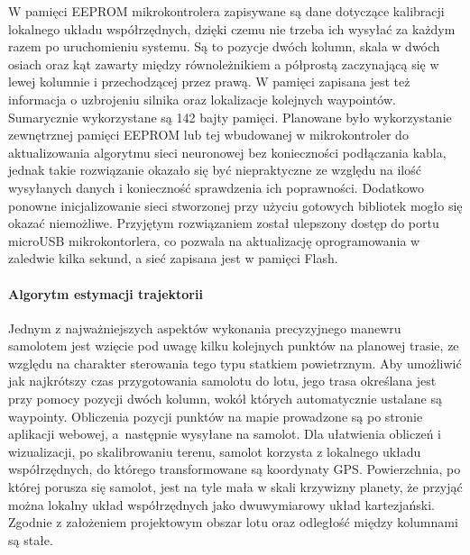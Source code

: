 \documentclass[12pt, a4paper]{article}
\begin{document}
W pamięci EEPROM mikrokontrolera zapisywane są dane dotyczące kalibracji lokalnego  układu współrzędnych, dzięki czemu nie trzeba ich wysyłać za każdym razem po uruchomieniu systemu. Są to pozycje dwóch kolumn, skala w dwóch osiach oraz kąt zawarty między równoleżnikiem a półprostą zaczynającą się w lewej kolumnie i przechodzącej przez prawą. W pamięci zapisana jest też informacja o uzbrojeniu silnika oraz lokalizacje kolejnych waypointów. Sumarycznie wykorzystane są 142 bajty pamięci. Planowane było wykorzystanie zewnętrznej pamięci EEPROM lub tej wbudowanej w mikrokontroler do aktualizowania algorytmu sieci neuronowej bez konieczności podłączania kabla, jednak takie rozwiązanie okazało się być niepraktyczne ze względu na ilość wysyłanych danych i konieczność sprawdzenia ich poprawności. Dodatkowo ponowne inicjalizowanie sieci stworzonej przy użyciu gotowych bibliotek mogło się okazać niemożliwe. Przyjętym rozwiązaniem został ulepszony dostęp do portu microUSB mikrokontorlera, co pozwala na aktualizację oprogramowania w zaledwie kilka sekund, a sieć zapisana jest w pamięci Flash.

\FloatBarrier
\paragraph{Algorytm estymacji trajektorii}\mbox{}

Jednym z najważniejszych aspektów wykonania precyzyjnego manewru samolotem jest wzięcie pod uwagę kilku kolejnych punktów na planowej trasie, ze względu na charakter sterowania tego typu statkiem powietrznym. Aby umożliwić jak najkrótszy czas przygotowania samolotu do lotu, jego trasa określana jest przy pomocy pozycji dwóch kolumn, wokół których automatycznie ustalane są waypointy. Obliczenia pozycji punktów na mapie prowadzone są po stronie aplikacji webowej, a~następnie wysyłane na samolot. Dla ułatwienia obliczeń i wizualizacji, po skalibrowaniu terenu, samolot korzysta z lokalnego układu współrzędnych, do którego transformowane są koordynaty GPS. Powierzchnia, po której porusza się samolot, jest na tyle mała w skali krzywizny planety, że przyjąć można lokalny układ współrzędnych jako dwuwymiarowy układ kartezjański. Zgodnie z założeniem projektowym obszar lotu oraz odległość między kolumnami są stałe.
\end{document}
